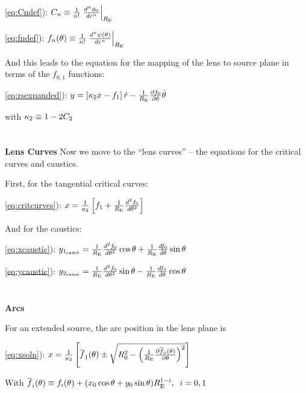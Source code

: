 \eqref{eq:Cndef}): $C_n \equiv {1 \over n!} \left. {d^n \phi_0 \over dr^n }\right|_{R_{\mathrm{E}}}$

\eqref{eq:fndef}): $f_n(\theta) \equiv  {1 \over n!} \left. {d^n \psi(\theta) \over dr^n }\right|_{R_{\mathrm{E}}}$

And this leads to the equation for the mapping of the lens to source plane in terms of the $f_{0,1}$ functions:

\eqref{eq:rsexpanded}):  $y = \left[ \kappa_2 x - f_1 \right] \hat{r} - {1 \over R_{\mathrm{E}}} {\partial f_0 \over \partial \theta}  \hat{\theta}$

with  $\kappa_2 \equiv 1-2 C_2$
\\
\\
\\
{\bf Lens Curves}
Now we move to the ``lens curves'' -- the equations for the critical curves and caustics.

First, for the tangential critical curves:

\eqref{eq:critcurves}): $x=\frac{1}{\kappa_2}\left[f_1+\frac{1}{R_{\mathrm{E}}}\frac{d^2f_0}{d\theta^2}\right] \label{xte}$

And for the caustics:

\eqref{eq:xcaustic}): $y_{1_\mathrm{caust}} = \frac{1}{R_{\mathrm{E}}}\frac{d^2f_0}{d\theta^2}\cos{\theta}+\frac{1}{R_{\mathrm{E}}}\frac{df_0}{d\theta}\sin{\theta}$

\eqref{eq:ycaustic}): $y_{2_\mathrm{caust}} = \frac{1}{R_{\mathrm{E}}}\frac{d^2f_0}{d\theta^2}\sin{\theta}-\frac{1}{R_{\mathrm{E}}}\frac{df_0}{d\theta}\cos{\theta}$
\\
\\
\\
{\bf Arcs}

For an extended source, the arc position in the lens plane is

\eqref{eq:xsoln}):  $x = \frac{1}{\kappa_2}\left[ \overline{f}_{1}(\theta) \pm \sqrt{R_0^2 - \left( \frac{1}{R_{\mathrm{E}}}\frac{\partial \overline{f}_0(\theta)}{\partial \theta} \right)^2} \right] $

With $\overline{f}_i(\theta) \equiv f_i(\theta) + (x_0 \cos \theta + y_0 \sin \theta)R_{\mathrm{E}}^{1-i}, \;\; i=0,1 $
